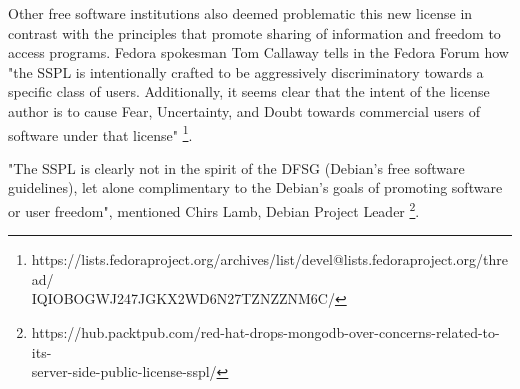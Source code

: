 \documentclass[12pt, a4paper]{article}
\begin{document}

  Other free software institutions also deemed problematic this new license in contrast with the principles that promote sharing of information and freedom to access programs. Fedora spokesman Tom Callaway tells in the Fedora Forum how "the SSPL is intentionally crafted to be aggressively discriminatory towards a specific class of users. Additionally, it seems clear that the intent of the license author is to cause Fear, Uncertainty, and Doubt towards commercial users of software under that license" 
  \footnote{https://lists.fedoraproject.org/archives/list/devel@lists.fedoraproject.org/thread/\\IQIOBOGWJ247JGKX2WD6N27TZNZZNM6C/}. 
  
  "The SSPL is clearly not in the spirit of the DFSG (Debian's free software guidelines), let alone complimentary to the Debian's goals of promoting software or user freedom", mentioned Chirs Lamb, Debian Project Leader 
  \footnote{https://hub.packtpub.com/red-hat-drops-mongodb-over-concerns-related-to-its-\\server-side-public-license-sspl/}. 
  
\end{document}
